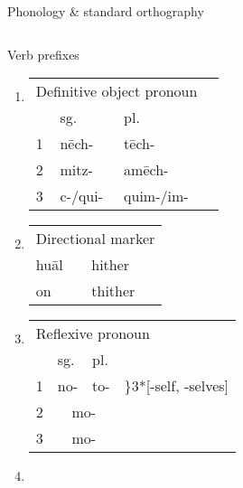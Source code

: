 \documentclass[12pt]{beamer}
\newcommand{\nah}[1]{\textcolor{nahgrn}{#1}}
\newcommand{\trs}[1]{\textcolor{nahblu}{#1}}
\begin{document}
\begin{frame}
\begin{columns}[t]
\begin{column}{.22\linewidth}
\begin{block}{Phonology \& standard orthography}
\begin{threeparttable}
\begin{tablenotes}
\begin{frame}
\begin{frame}
\begin{columns}[t]
\begin{column}{0.18\linewidth}
\begin{block}{Verb prefixes}
\begin{enumerate}
\begin{threeparttable}
                \end{threeparttable}
          \item
                \begin{tabular}[t]{llll}
                  \multicolumn{3}{l}{Definitive object pronoun} \\
                    & sg.           & pl.                       \\
                  1 & \nah{nēch-}   & \nah{tēch-}               \\
                  2 & \nah{mitz-}   & \nah{amēch-}              \\
                  3 & \nah{c-/qui-} & \nah{quim-/im-}           \\
                \end{tabular}
          \item
                \begin{tabular}[t]{ll}
                  \multicolumn{2}{l}{Directional marker} \\
                  \nah{huāl} & \trs{hither}              \\
                  \nah{on}   & \trs{thither}             \\
                \end{tabular}
          \item
                \begin{tabular}[t]{llll}
                  \multicolumn{4}{l}{Reflexive pronoun}                                                              \\
                    & sg.                           & pl.       &                                                    \\
                  1 & \nah{no-}                     & \nah{to-} & \trs{\hspace{-1em}\rdelim\}{3}{*}[-self, -selves]} \\
                  2 & \multicolumn{2}{c}{\nah{mo-}}                                                                  \\
                  3 & \multicolumn{2}{c}{\nah{mo-}}                                                                  \\
                \end{tabular}
          \item
                \begin{tabular}[t]{ll}

\end{tabular}
\end{enumerate}
\end{block}
\end{column}
\end{columns}
\end{frame}
\end{frame}
\end{tablenotes}
\end{threeparttable}
\end{block}
\end{column}
\end{columns}
\end{frame}
\end{document}
